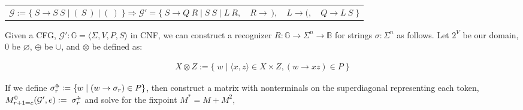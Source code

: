 \documentclass[sigplan,review,anonymous,acmsmall]{acmart}\settopmatter{printfolios=false,printccs=false,printacmref=false}
\begin{document}
\begin{table}[H]
\begin{tabular}{llll}
$\mathcal{G}:=\big\{\;S \rightarrow S\:S \mid (\:S\:) \mid (\:)\;\big\} \Longrightarrow \mathcal{G}'=\big\{\;S\rightarrow Q\:R \mid S\:S \mid L\:R,$ & $R \rightarrow\:),$ & $L \rightarrow (,$ & $Q\rightarrow L\:S\;\big\}$
\end{tabular}
\end{table}\vspace{-8pt}

\noindent Given a CFG, $\mathcal{G}' : \mathbb{G} = \langle \Sigma, V, P, S\rangle$ in CNF, we can construct a recognizer $R: \mathbb{G} \rightarrow \Sigma^n \rightarrow \mathbb{B}$ for strings $\sigma: \Sigma^n$ as follows. Let $2^V$ be our domain, $0$ be $\varnothing$, $\oplus$ be $\cup$, and $\otimes$ be defined as:\vspace{-10pt}

\begin{align}
X \otimes Z := \big\{\;w \mid \langle x, z\rangle \in X \times Z, (w\rightarrow xz) \in P\;\big\}
\end{align}

\noindent If we define $\sigma_r^{\shortuparrow\hspace{-5pt}\shortrightarrow} \coloneqq \{w \mid (w \rightarrow \sigma_r) \in P\}$, then construct a matrix with nonterminals on the superdiagonal representing each token, $M^0_{r+1=c}(\mathcal{G}', e) := \;\sigma_r^{\shortuparrow\hspace{-5pt}\shortrightarrow}$ and solve for the fixpoint $M^* = M + M^2$,\vspace{-10pt}
\end{document}
